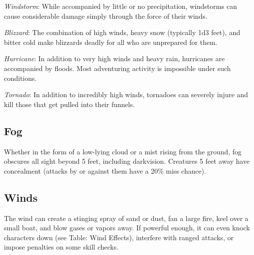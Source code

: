 \textit{Windstorm}: While accompanied by little or no precipitation, windstorms can cause considerable damage simply through the force of their winds.
				
\textit{Blizzard}: The combination of high winds, heavy snow (typically 1d3 feet), and bitter cold make blizzards deadly for all who are unprepared for them.
				
\textit{Hurricane}: In addition to very high winds and heavy rain, hurricanes are accompanied by floods. Most adventuring activity is impossible under such conditions.
				
\textit{Tornado}: In addition to incredibly high winds, tornadoes can severely injure and kill those that get pulled into their funnels.
				
\subsection{Fog}

				
Whether in the form of a low-lying cloud or a mist rising from the ground, fog obscures all sight beyond 5 feet, including darkvision. Creatures 5 feet away have concealment (attacks by or against them have a 20\% miss chance).
				
\subsection{Winds}

				
The wind can create a stinging spray of sand or dust, fan a large fire, keel over a small boat, and blow gases or vapors away. If powerful enough, it can even knock characters down (see Table: Wind Effects), interfere with ranged attacks, or impose penalties on some skill checks.


